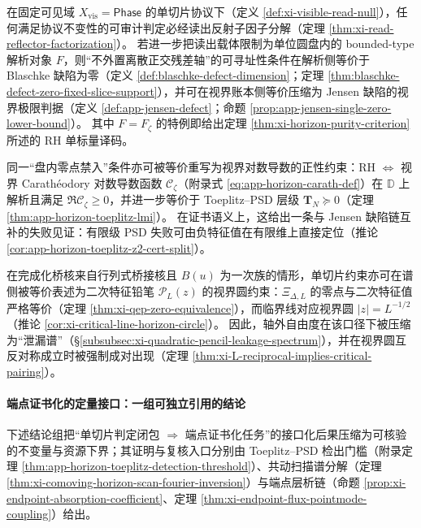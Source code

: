 \begin{corollary}\label{cor:xi-single-slice-rh-typing-principle}
在固定可见域 \(X_{\mathrm{vis}}=\mathsf{Phase}\) 的单切片协议下（定义 \ref{def:xi-visible-read-null}），任何满足协议不变性的可审计判定必经读出反射子因子分解（定理 \ref{thm:xi-read-reflector-factorization}）。
若进一步把读出载体限制为单位圆盘内的 bounded-type 解析对象 \(F\)，则“不外置离散正交残差轴”的可寻址性条件在解析侧等价于 Blaschke 缺陷为零（定义 \ref{def:blaschke-defect-dimension}；定理 \ref{thm:blaschke-defect-zero-fixed-slice-support}），并可在视界账本侧等价压缩为 Jensen 缺陷的视界极限判据（定义 \ref{def:app-jensen-defect}；命题 \ref{prop:app-jensen-single-zero-lower-bound}）。
其中 \(F=F_{\zeta}\) 的特例即给出定理 \ref{thm:xi-horizon-purity-criterion} 所述的 RH 单标量译码。
\par
同一“盘内零点禁入”条件亦可被等价重写为视界对数导数的正性约束：RH \(\Longleftrightarrow\) 视界 Carath\'eodory 对数导数函数 \(\mathscr{C}_{\zeta}\)（附录式 \eqref{eq:app-horizon-carath-def}）在 \(\mathbb{D}\) 上解析且满足 \(\Re\mathscr{C}_{\zeta}\ge 0\)，并进一步等价于 Toeplitz--PSD 层级 \(\mathbf{T}_N\succeq 0\)（定理 \ref{thm:app-horizon-toeplitz-lmi}）。
在证书语义上，这给出一条与 Jensen 缺陷链互补的失败见证：有限级 PSD 失败可由负特征值在有限维上直接定位（推论 \ref{cor:app-horizon-toeplitz-z2-cert-split}）。
\par
在完成化桥核来自行列式桥接核且 \(B(u)\) 为一次族的情形，单切片约束亦可在谱侧被等价表述为二次特征铅笔 \(\mathcal{P}_L(z)\) 的视界圆约束：\(\Xi_{\Delta,L}\) 的零点与二次特征值严格等价（定理 \ref{thm:xi-qep-zero-equivalence}），而临界线对应视界圆 \(|z|=L^{-1/2}\)（推论 \ref{cor:xi-critical-line-horizon-circle}）。
因此，轴外自由度在该口径下被压缩为“泄漏谱”（\S\ref{subsubsec:xi-quadratic-pencil-leakage-spectrum}），并在视界圆互反对称成立时被强制成对出现（定理 \ref{thm:xi-L-reciprocal-implies-critical-pairing}）。
\end{corollary}

\paragraph{端点证书化的定量接口：一组可独立引用的结论}
下述结论组把“单切片判定闭包 \(\Rightarrow\) 端点证书化任务”的接口化后果压缩为可核验的不变量与资源下界；其证明与复核入口分别由 Toeplitz--PSD 检出门槛（附录定理 \ref{thm:app-horizon-toeplitz-detection-threshold}）、共动扫描谱分解（定理 \ref{thm:xi-comoving-horizon-scan-fourier-inversion}）与端点层析链（命题 \ref{prop:xi-endpoint-absorption-coefficient}、定理 \ref{thm:xi-endpoint-flux-pointmode-coupling}）给出。

